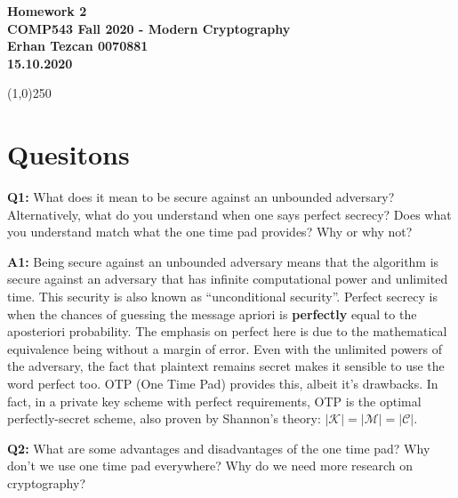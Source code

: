 \documentclass[12pt,reqno]{amsart}
\newcommand{\msgspc}[0]{\mathcal{M}}
\newcommand{\cphspc}[0]{\mathcal{C}}
\newcommand{\keyspc}[0]{\mathcal{K}}
\begin{document}
\begin{center}
\large\textbf{Homework 2 \\ COMP543 Fall 2020 - Modern Cryptography \\}
\normalsize\textbf{ Erhan Tezcan 0070881 \\ 15.10.2020} \\
\end{center}

\begin{center}
\line(1,0){250}
\end{center}

%
%

\section{Quesitons}

\textbf{Q1:} What does it mean to be secure against an unbounded adversary? Alternatively, what do you understand when one says perfect secrecy? Does what you understand match what the one time pad provides? Why or why not?

\textbf{A1:} Being secure against an unbounded adversary means that the algorithm is secure against an adversary that has infinite computational power and unlimited time. This security is also known as ``unconditional security''. Perfect secrecy is when the chances of guessing the message apriori is \textbf{perfectly} equal to the aposteriori probability. The emphasis on perfect here is due to the mathematical equivalence being without a margin of error. Even with the unlimited powers of the adversary, the fact that plaintext remains secret makes it sensible to use the word perfect too. OTP (One Time Pad) provides this, albeit it's drawbacks. In fact, in a private key scheme with perfect requirements, OTP is the optimal perfectly-secret scheme, also proven by Shannon's theory: $|\keyspc|=|\msgspc|=|\cphspc|$.

\vspace{20px}
\textbf{Q2:} What are some advantages and disadvantages of the one time pad? Why don't we use one time pad everywhere? Why do we need more research on cryptography?
\end{document}
